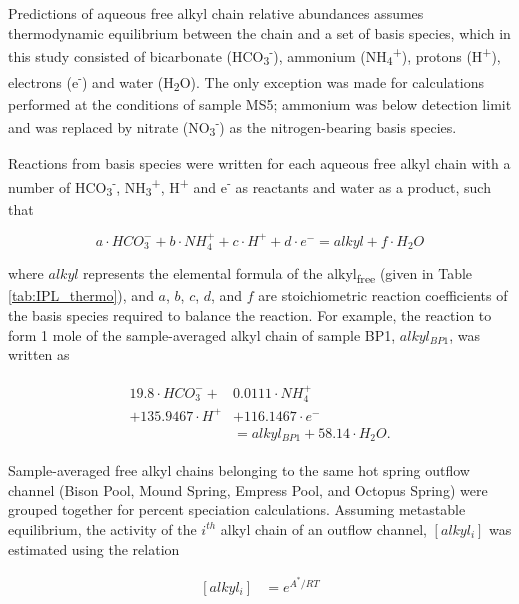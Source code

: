 Predictions of aqueous free alkyl chain relative abundances assumes thermodynamic equilibrium between the chain and a set of basis species, which in this study consisted of bicarbonate (HCO\textsubscript{3}\textsuperscript{-}), ammonium (NH\textsubscript{4}\textsuperscript{+}), protons (H\textsuperscript{+}), electrons (e\textsuperscript{-}) and water (H\textsubscript{2}O). The only exception was made for calculations performed at the conditions of sample MS5; ammonium was below detection limit and was replaced by nitrate (NO\textsubscript{3}\textsuperscript{-}) as the nitrogen-bearing basis species.

Reactions from basis species were written for each aqueous free alkyl chain with a number of HCO\textsubscript{3}\textsuperscript{-}, NH\textsubscript{3}\textsuperscript{+}, H\textsuperscript{+} and e\textsuperscript{-} as reactants and water as a product, such that

\begin{equation}
    a\cdot HCO_{3}^{-} + b\cdot NH_{4}^{+} + c\cdot H^{+} + d\cdot e^{-} = alkyl + f\cdot H_{2}O
\end{equation}

\noindent where $alkyl$ represents the elemental formula of the alkyl\textsubscript{free} (given in Table \ref{tab:IPL_thermo}), and $a$, $b$, $c$, $d$, and $f$ are stoichiometric reaction coefficients of the basis species required to balance the reaction. For example, the reaction to form 1 mole of the sample-averaged alkyl chain of sample BP1, $alkyl_{BP1}$, was written as

\begin{align}
\begin{split}
    19.8\cdot HCO_{3}^{-} + &0.0111\cdot NH_{4}^{+}\\
    + 135.9467\cdot H^{+} &+ 116.1467\cdot e^{-}\\
    &= alkyl_{BP1} + 58.14\cdot H_{2}O.
\end{split}
\end{align}

Sample-averaged free alkyl chains belonging to the same hot spring outflow channel (Bison Pool, Mound Spring, Empress Pool, and Octopus Spring) were grouped together for percent speciation calculations. Assuming metastable equilibrium, the activity of the $i^{th}$ alkyl chain of an outflow channel, $[alkyl_{i}]$ was estimated using the relation

\begin{equation} \label{eq:alkyl_activity}
\begin{split}
[alkyl_{i}] & = e^{A^{*}/RT}
\end{split}
\end{equation}

